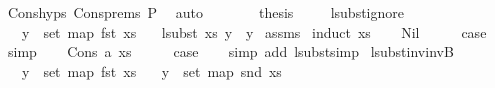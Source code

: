 \begin{isabellebody}
\ Cons{\isachardot}{\kern0pt}hyps\ Cons{\isachardot}{\kern0pt}prems{\isacharparenleft}{\kern0pt}{}{\isacharparenright}{\kern0pt}\ P{}\ \isamarkupfalse%
\ auto\isanewline
\ \ \ \ \isamarkupfalse%
\ \isamarkupfalse%
\ {\isacharquery}{\kern0pt}thesis\ \isakeywordONE{{\isachardot}{\kern0pt}}\isamarkupfalse%
\isanewline
\ \ \isamarkupfalse%
\isanewline
{}\isamarkupfalse%
%
\endisatagproof
{\isafoldproof}%
%
\isadelimproof
\isanewline
%
\endisadelimproof
\isanewline
\isanewline
{}\isamarkupfalse%
\ lsubst{\isacharunderscore}{\kern0pt}ignore{\isacharcolon}{\kern0pt}\isanewline
\ \ \ {\isachardoublequoteopen}y\ {\isasymnotin}\ set\ {\isacharparenleft}{\kern0pt}map\ fst\ xs{\isacharparenright}{\kern0pt}{\isachardoublequoteclose}\isanewline
\ \ \ {\isachardoublequoteopen}lsubst\ xs\ y\ {\isacharequal}{\kern0pt}\ y{\isachardoublequoteclose}\isanewline
%
\isadelimproof
%
\endisadelimproof
%
\isatagproof
{}\isamarkupfalse%
\ assms\isanewline
{}\isamarkupfalse%
\ {\isacharparenleft}{\kern0pt}induct\ xs{\isacharparenright}{\kern0pt}\isanewline
\ \ \isamarkupfalse%
\ Nil\isanewline
\ \ \isamarkupfalse%
\ \isamarkupfalse%
\ {\isacharquery}{\kern0pt}case\isanewline
\ \ \isamarkupfalse%
\ simp\isanewline
{}\isamarkupfalse%
\isanewline
\ \ \isamarkupfalse%
\ {\isacharparenleft}{\kern0pt}Cons\ a\ xs{\isacharparenright}{\kern0pt}\isanewline
\ \ \isamarkupfalse%
\ \isamarkupfalse%
\ {\isacharquery}{\kern0pt}case\isanewline
\ \ \isamarkupfalse%
\ {\isacharparenleft}{\kern0pt}simp\ add{\isacharcolon}{\kern0pt}\ lsubst{\isacharunderscore}{\kern0pt}simp{\isacharparenright}{\kern0pt}\isanewline
{}\isamarkupfalse%
%
\endisatagproof
{\isafoldproof}%
%
\isadelimproof
\isanewline
%
\endisadelimproof
\isanewline
\isanewline
{}\isamarkupfalse%
\ lsubst{\isacharunderscore}{\kern0pt}inv{\isacharunderscore}{\kern0pt}invB{\isacharcolon}{\kern0pt}\isanewline
\ \ \ {\isachardoublequoteopen}y\ {\isasymnotin}\ set\ {\isacharparenleft}{\kern0pt}map\ fst\ xs{\isacharparenright}{\kern0pt}{\isachardoublequoteclose}\isanewline
\ \ \ {\isachardoublequoteopen}y\ {\isasymnotin}\ set\ {\isacharparenleft}{\kern0pt}map\ snd\ xs{\isacharparenright}{\kern0pt}{\isachardoublequoteclose}\isanewline

\end{isabellebody}
